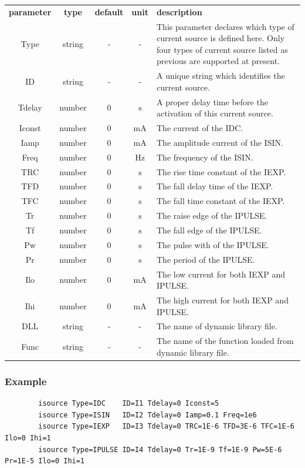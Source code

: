 \documentclass[11pt,pdftex]{article}
\begin{document}
\small
\noindent\begin{longtable}{ccccp{7cm}}
\textbf{parameter}   & \textbf{type}    & \textbf{default} & \textbf{unit} & \textbf{description} \\
Type   & string  & -  & -    & This parameter declares which type of current source is defined here.
                               Only four types of current source listed as previous are supported at present. \\
ID     & string  & -  & -    & A unique string which identifies the current source.\\
Tdelay & number  & 0  & $\mathrm{s}$  & A proper delay time before the activation of this current source. \\
Iconst & number  & 0  & $\mathrm{mA}$ & The current of the IDC. \\
Iamp   & number  & 0  & $\mathrm{mA}$ & The amplitude current of the ISIN. \\
Freq   & number  & 0  & $\mathrm{Hz}$ & The frequency of the ISIN. \\
TRC    & number  & 0  & $\mathrm{s}$  & The rise time constant of the IEXP. \\
TFD    & number  & 0  & $\mathrm{s}$  & The fall delay time of the IEXP. \\
TFC    & number  & 0  & $\mathrm{s}$  & The fall time constant of the IEXP. \\
Tr     & number  & 0  & $\mathrm{s}$  & The raise edge of the IPULSE. \\
Tf     & number  & 0  & $\mathrm{s}$  & The fall edge of the IPULSE. \\
Pw     & number  & 0  & $\mathrm{s}$  & The pulse with of the IPULSE. \\
Pr     & number  & 0  & $\mathrm{s}$  & The period of the IPULSE. \\
Ilo    & number  & 0  & $\mathrm{mA}$ & The low current for both IEXP and IPULSE. \\
Ihi    & number  & 0  & $\mathrm{mA}$ & The high current for both IEXP and IPULSE. \\
DLL    & string  & -  & -             & The name of dynamic library file.\\
Func   & string  & -  & -             & The name of the function loaded from dynamic library file.
\end{longtable}
\normalsize

\subsubsection*{Example}
\begin{verbatim}
        isource Type=IDC    ID=I1 Tdelay=0 Iconst=5
        isource Type=ISIN   ID=I2 Tdelay=0 Iamp=0.1 Freq=1e6
        isource Type=IEXP   ID=I3 Tdelay=0 TRC=1E-6 TFD=3E-6 TFC=1E-6 Ilo=0 Ihi=1
        isource Type=IPULSE ID=I4 Tdelay=0 Tr=1E-9 Tf=1E-9 Pw=5E-6 Pr=1E-5 Ilo=0 Ihi=1
\end{verbatim}
\end{document}
